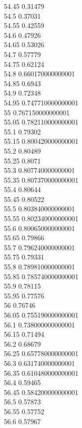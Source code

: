{54.45	0.31479\\
54.5	0.37031\\
54.55	0.42559\\
54.6	0.47926\\
54.65	0.53026\\
54.7	0.57779\\
54.75	0.62124\\
54.8	0.660170000000001\\
54.85	0.6943\\
54.9	0.72348\\
54.95	0.747710000000001\\
55	0.767150000000001\\
55.05	0.782110000000001\\
55.1	0.79302\\
55.15	0.800420000000001\\
55.2	0.80489\\
55.25	0.8071\\
55.3	0.807740000000001\\
55.35	0.807370000000001\\
55.4	0.80644\\
55.45	0.80522\\
55.5	0.803840000000001\\
55.55	0.802340000000001\\
55.6	0.800650000000001\\
55.65	0.79866\\
55.7	0.796240000000001\\
55.75	0.79331\\
55.8	0.789810000000001\\
55.85	0.785740000000001\\
55.9	0.78115\\
55.95	0.77576\\
56	0.76746\\
56.05	0.755190000000001\\
56.1	0.738000000000001\\
56.15	0.71494\\
56.2	0.68679\\
56.25	0.657780000000001\\
56.3	0.631740000000001\\
56.35	0.610480000000001\\
56.4	0.59465\\
56.45	0.584200000000001\\
56.5	0.57873\\
56.55	0.57752\\
56.6	0.57967\\
}
